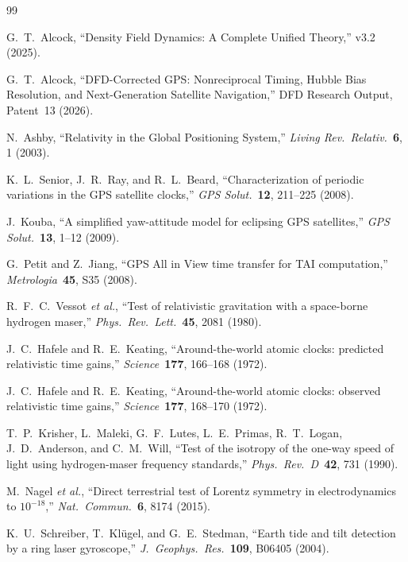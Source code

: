 \documentclass[aps,prl,twocolumn,superscriptaddress,showpacs]{revtex4-2}
\begin{document}
\begin{thebibliography}{99}

G.~T.~Alcock, ``Density Field Dynamics: A Complete Unified Theory,''
v3.2 (2025).

G.~T.~Alcock, ``DFD-Corrected GPS: Nonreciprocal Timing, Hubble Bias
Resolution, and Next-Generation Satellite Navigation,''
DFD Research Output, Patent~13 (2026).

N.~Ashby, ``Relativity in the Global Positioning System,''
\textit{Living Rev.\ Relativ.}\ \textbf{6}, 1 (2003).

K.~L.~Senior, J.~R.~Ray, and R.~L.~Beard,
``Characterization of periodic variations in the GPS satellite clocks,''
\textit{GPS Solut.}\ \textbf{12}, 211--225 (2008).

J.~Kouba, ``A simplified yaw-attitude model for eclipsing GPS
satellites,'' \textit{GPS Solut.}\ \textbf{13}, 1--12 (2009).

G.~Petit and Z.~Jiang, ``GPS All in View time transfer for TAI
computation,'' \textit{Metrologia}\ \textbf{45}, S35 (2008).

R.~F.~C.~Vessot \textit{et al.}, ``Test of relativistic gravitation
with a space-borne hydrogen maser,''
\textit{Phys.\ Rev.\ Lett.}\ \textbf{45}, 2081 (1980).

J.~C.~Hafele and R.~E.~Keating, ``Around-the-world atomic clocks:
predicted relativistic time gains,''
\textit{Science}\ \textbf{177}, 166--168 (1972).

J.~C.~Hafele and R.~E.~Keating, ``Around-the-world atomic clocks:
observed relativistic time gains,''
\textit{Science}\ \textbf{177}, 168--170 (1972).

T.~P.~Krisher, L.~Maleki, G.~F.~Lutes, L.~E.~Primas,
R.~T.~Logan, J.~D.~Anderson, and C.~M.~Will,
``Test of the isotropy of the one-way speed of light using
hydrogen-maser frequency standards,''
\textit{Phys.\ Rev.\ D}\ \textbf{42}, 731 (1990).

M.~Nagel \textit{et al.}, ``Direct terrestrial test of Lorentz
symmetry in electrodynamics to $10^{-18}$,''
\textit{Nat.\ Commun.}\ \textbf{6}, 8174 (2015).

K.~U.~Schreiber, T.~Kl\"ugel, and G.~E.~Stedman,
``Earth tide and tilt detection by a ring laser gyroscope,''
\textit{J.\ Geophys.\ Res.}\ \textbf{109}, B06405 (2004).


\end{thebibliography}
\end{document}
